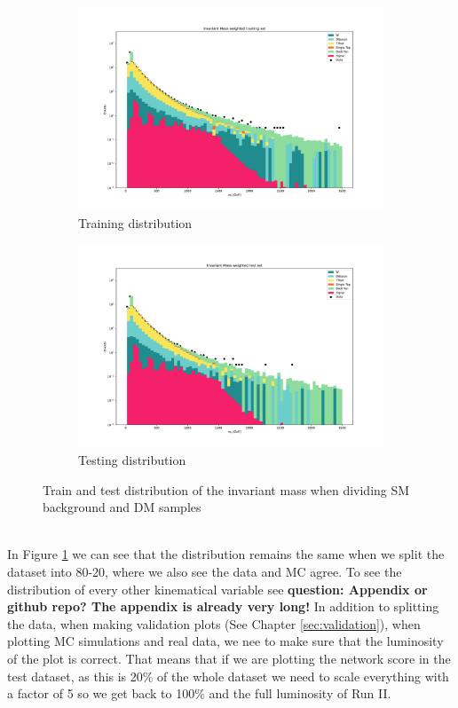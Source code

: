 \documentclass[14pt, a4paper]{book}
\begin{document}
\begin{figure}[!ht]
	\centering
	\begin{subfigure}[b]{0.49\textwidth}
        \centering
        \includegraphics[width=1\textwidth]{mll_train.pdf}
        \caption{Training distribution}
     \end{subfigure}
     \hfill
     \begin{subfigure}[b]{0.49\textwidth}
        \centering
        \includegraphics[width=1\textwidth]{mll_test.pdf}
        \caption{Testing distribution}
     \end{subfigure}
	\caption[Train-test split distribution]{Train and test distribution of the invariant mass when dividing SM background and DM samples}\label{fig:train-test}
\end{figure}
\\In Figure \ref{fig:train-test}  we can see that the distribution remains the same when we split the dataset into 80-20, where we also see the data and MC agree. To see the distribution of every other kinematical variable see \textbf{question: Appendix or github repo? The appendix is already very long!}
In addition to splitting the data, when making validation plots (See Chapter \ref{sec:validation}), when plotting MC simulations and real data, we nee to make sure that the luminosity of the plot is correct. That means that if we are plotting the network score in 
the test dataset, as this is 20\% of the whole dataset we need to scale everything with a factor of 5 so we get back to 100\% and the full luminosity of Run II.
\end{document}
